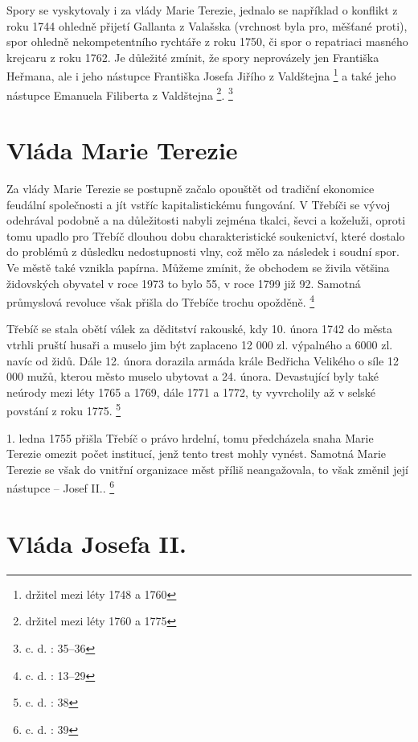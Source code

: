 \documentclass[a4paper,oneside,12p]{report}
\begin{document}
Spory se vyskytovaly i za vlády Marie Terezie, jednalo se například o konflikt z roku 1744 ohledně přijetí Gallanta z Valašska (vrchnost byla pro, měšťané proti), spor ohledně nekompetentního rychtáře z roku 1750, či spor o repatriaci masného krejcaru z roku 1762.
Je důležité zmínit, že spory neprovázely jen Františka Heřmana, ale i jeho nástupce Františka Josefa Jiřího z Valdštejna \footnote{držitel mezi léty 1748 a 1760} a také jeho nástupce Emanuela Filiberta z Valdštejna \footnote{držitel mezi léty 1760 a 1775}. \footnote{c. d. : 35--36}


\section{Vláda Marie Terezie}

Za vlády Marie Terezie se postupně začalo opouštět od tradiční ekonomice feudální společnosti a jít vstříc kapitalistickému fungování.
V Třebíči se vývoj odehrával podobně a na důležitosti nabyli zejména tkalci, ševci a koželuži, oproti tomu upadlo pro Třebíč dlouhou dobu charakteristické soukenictví, které dostalo do problémů z důsledku nedostupnosti vlny, což mělo za následek i soudní spor.
Ve městě také vznikla papírna.
Můžeme zmínit, že obchodem se živila většina židovských obyvatel v roce 1973 to bylo 55, v roce 1799 již 92.
Samotná průmyslová revoluce však přišla do Třebíče trochu opožděně. \footnote{c. d. : 13--29}

Třebíč se stala obětí válek za děditství rakouské, kdy 10. února 1742 do města vtrhli pruští husaři a muselo jim být zaplaceno 12 000 zl. výpalného a 6000 zl. navíc od židů.
Dále 12. února dorazila armáda krále Bedřicha Velikého o síle 12 000 mužů, kterou město muselo ubytovat a 24. února.
Devastující byly také neúrody mezi léty 1765 a 1769, dále 1771 a 1772, ty vyvrcholily až v selské povstání z roku 1775. \footnote{c. d. : 38}

1. ledna 1755 přišla Třebíč o právo hrdelní, tomu předcházela snaha Marie Terezie omezit počet institucí, jenž tento trest mohly vynést.
Samotná Marie Terezie se však do vnitřní organizace měst příliš neangažovala, to však změnil její nástupce -- Josef II.. \footnote{c. d. : 39}

\section{Vláda Josefa II.}
\end{document}
